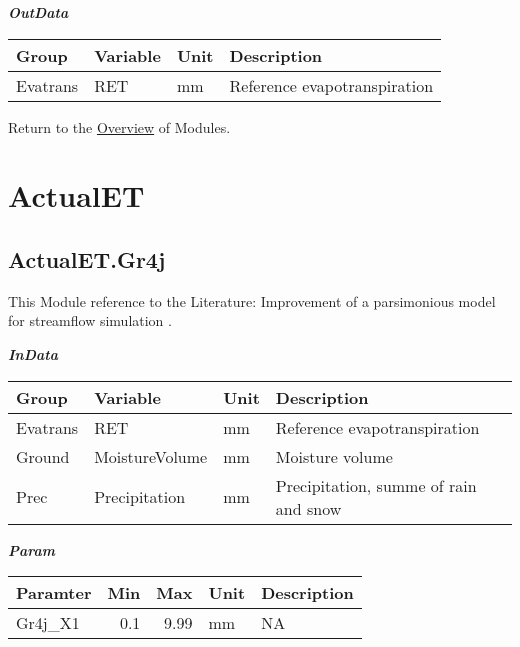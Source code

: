 \documentclass[
]{book}
\begin{document}
\textbf{\emph{OutData}}

\begin{table}[!h]
\centering
\begin{tabular}{l|l|l|l}
\hline
Group & Variable & Unit & Description\\
\hline
Evatrans & RET & mm & Reference evapotranspiration\\
\hline
\end{tabular}
\end{table}

Return to the \protect\hyperlink{module}{Overview} of Modules.

\hypertarget{ActualET}{%
\section{ActualET}\label{ActualET}}

\hypertarget{ActualET.Gr4j}{%
\subsection{ActualET.Gr4j}\label{ActualET.Gr4j}}

This Module reference to the Literature: Improvement of a parsimonious model for streamflow simulation \citep{Perrin.2003}.

\textbf{\emph{InData}}

\begin{table}[!h]
\centering
\begin{tabular}{l|l|l|l}
\hline
Group & Variable & Unit & Description\\
\hline
Evatrans & RET & mm & Reference evapotranspiration\\
\cline{1-4}
Ground & MoistureVolume & mm & Moisture volume\\
\cline{1-4}
Prec & Precipitation & mm & Precipitation, summe of rain and snow\\
\hline
\end{tabular}
\end{table}

\textbf{\emph{Param}}

\begin{table}[!h]
\centering
\begin{tabular}{l|r|r|l|l}
\hline
Paramter & Min & Max & Unit & Description\\
\hline
Gr4j\_X1 & 0.1 & 9.99 & mm & NA\\
\hline
\end{tabular}
\end{table}
\end{document}
